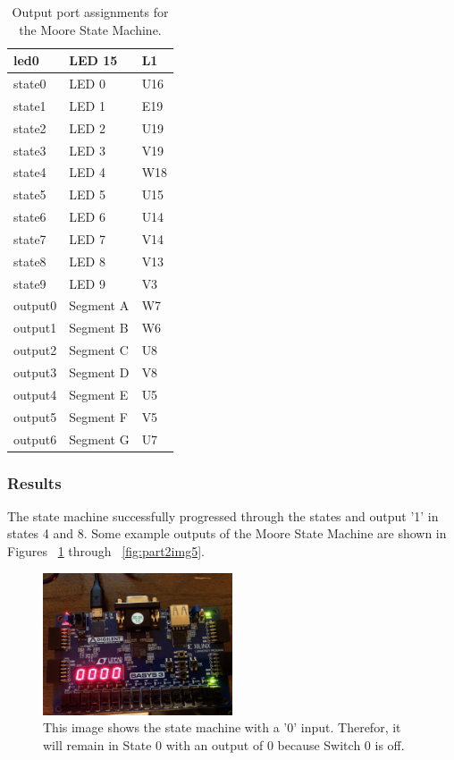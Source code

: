 \documentclass[11pt]{article}
\begin{document}
\begin{table}[H]
\begin{center}
\begin{tabular}{| l | l | l |}
	\hline
	led0 & LED 15 & L1 \\ \hline
	state0 & LED 0 & U16 \\ \hline
	state1 & LED 1 & E19 \\ \hline
	state2 & LED 2 & U19 \\ \hline
	state3 & LED 3 & V19 \\ \hline
	state4 & LED 4 & W18 \\ \hline
	state5 & LED 5 & U15 \\ \hline
	state6 & LED 6 & U14 \\ \hline
	state7 & LED 7 & V14 \\ \hline
	state8 & LED 8 & V13 \\ \hline
	state9 & LED 9 & V3 \\ \hline
	output0 & Segment A & W7 \\ \hline
	output1 & Segment B & W6 \\ \hline
	output2 & Segment C & U8 \\ \hline
	output3 & Segment D & V8 \\ \hline
	output4 & Segment E & U5 \\ \hline
	output5 & Segment F & V5 \\ \hline
	output6 & Segment G & U7 \\ \hline
\end{tabular}
\caption{\label{tab:moore_output_ports}Output port assignments for the Moore State Machine.}
\end{center}
\end{table}

\subsubsection{Results}
The state machine successfully progressed through the states and output '1' in states 4 and 8. Some example outputs of the Moore State Machine are shown in Figures ~\ref{fig:part2img1} through ~\ref{fig:part2img5}.

\begin{center}
\begin{figure}[H]
	\includegraphics[width=0.5\textwidth]{./images/Part2/IMG_0578.jpg}
	\caption{\label{fig:part2img1}This image shows the state machine with a '0' input. Therefor, it will remain in State 0 with an output of 0 because Switch 0 is off.}
\end{figure}
\end{center}
\end{document}
